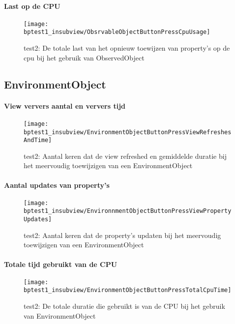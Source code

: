 \paragraph{Last op de CPU}
\begin{figure}[H]
    \centering
    \texttt{[image: bptest1\_insubview/ObsrvableObjectButtonPressCpuUsage]} 
    \caption{test2: De totale last van het opnieuw toewijzen van property's op de cpu bij het gebruik van ObservedObject}
    \label{fig:cpuWeightObservedObject1}
\end{figure}

\subsection{EnvironmentObject}
\paragraph{View ververs aantal en ververs tijd}
\begin{figure}[H]
    \centering
    \texttt{[image: bptest1\_insubview/EnvironmentObjectButtonPressViewRefreshesAndTime]} 
    \caption{test2: Aantal keren dat de view refreshed en gemiddelde duratie bij het meervoudig toewijzigen van een EnvironmentObject}
    \label{fig:viewRefresheEnvironmentObject1}
\end{figure}
\paragraph{Aantal updates van property's}
\begin{figure}[H]
    \centering
    \texttt{[image: bptest1\_insubview/EnvironnmentObjectButtonPressViewPropertyUpdates]} 
    \caption{test2: Aantal keren dat de property's updaten bij het meervoudig toewijzigen van een EnvironmentObject}
    \label{fig:propertyUpdatesEnvironmentObject1}
\end{figure}
\paragraph{Totale tijd gebruikt van de CPU}
\begin{figure}[H]
    \centering
    \texttt{[image: bptest1\_insubview/EnvironmentObjectButtonPressTotalCpuTime]} 
    \caption{test2: De totale duratie die gebruikt is van de CPU bij het gebruik van EnvironmentObject}
    \label{fig:cpuUsageTimeEnvironmentObject1}
\end{figure}
